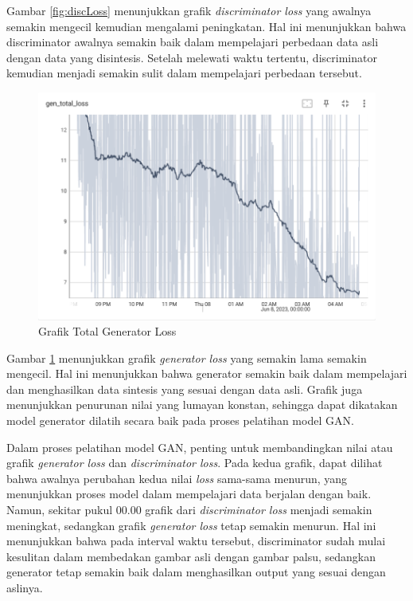 Gambar \ref{fig:discLoss} menunjukkan grafik \emph{discriminator loss} yang awalnya semakin mengecil kemudian mengalami peningkatan. 
Hal ini menunjukkan bahwa discriminator awalnya semakin baik dalam mempelajari perbedaan data asli dengan data yang disintesis. 
Setelah melewati waktu tertentu, discriminator kemudian menjadi semakin sulit dalam mempelajari perbedaan tersebut. 

\begin{figure}[ht]
  \centering
  \includegraphics[scale=0.6]{gambar/Gen_total_loss.png}
  \caption{Grafik Total Generator Loss}
  \label{fig:genLoss}
\end{figure}

Gambar \ref{fig:genLoss} menunjukkan grafik \emph{generator loss} yang semakin lama semakin mengecil. 
Hal ini menunjukkan bahwa generator semakin baik dalam mempelajari dan menghasilkan data sintesis yang sesuai dengan data asli. 
Grafik juga menunjukkan penurunan nilai yang lumayan konstan, sehingga dapat dikatakan model generator dilatih secara baik pada proses pelatihan model GAN.

Dalam proses pelatihan model GAN, penting untuk membandingkan nilai atau grafik \emph{generator loss} dan \emph{discriminator loss}. 
Pada kedua grafik, dapat dilihat bahwa awalnya perubahan kedua nilai \emph{loss} sama-sama menurun, yang menunjukkan proses model dalam mempelajari data berjalan dengan baik. 
Namun, sekitar pukul 00.00 grafik dari \emph{discriminator loss} menjadi semakin meningkat, sedangkan grafik \emph{generator loss} tetap semakin menurun. 
Hal ini menunjukkan bahwa pada interval waktu tersebut, discriminator sudah mulai kesulitan dalam membedakan gambar asli dengan gambar palsu, sedangkan generator tetap semakin baik dalam menghasilkan output yang sesuai dengan aslinya.
\newpage
